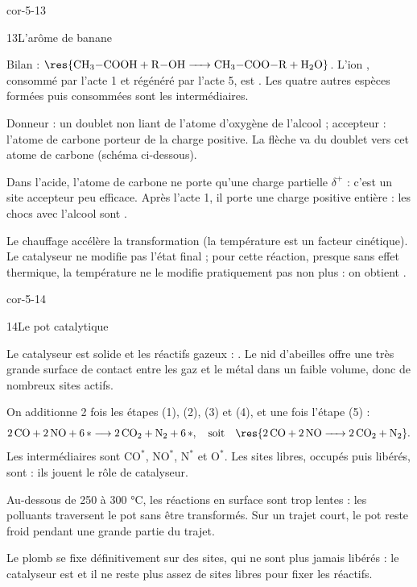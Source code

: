 \begin{blocLivre}{cor-5-13}
\begin{corrige}{13}{L'arôme de banane}
\begin{questions}
\item Bilan : $\res{\ce{CH3-COOH + R-OH -> CH3-COO-R + H2O}}$. L'ion , consommé par l'acte 1 et régénéré par
l'acte 5, est . Les quatre autres espèces formées puis consommées sont les intermédiaires.
\item Donneur : un doublet non liant de l'atome d'oxygène de l'alcool ; accepteur : l'atome de carbone porteur de la
charge positive. La flèche va du doublet vers cet atome de carbone (schéma ci-dessous).
\item Dans l'acide, l'atome de carbone ne porte qu'une charge partielle $\delta^+$ : c'est un site accepteur peu
efficace. Après l'acte 1, il porte une charge positive entière : les chocs avec l'alcool sont .
\item Le chauffage accélère la transformation (la température est un facteur cinétique). Le catalyseur ne modifie
pas l'état final ; pour cette réaction, presque sans effet thermique, la température ne le modifie pratiquement pas
non plus : on obtient .
\end{questions}
\end{corrige}
\end{blocLivre}
\begin{blocLivre}{cor-5-14}
\begin{corrige}{14}{Le pot catalytique}
\begin{questions}
\item Le catalyseur est solide et les réactifs gazeux : . Le nid d'abeilles offre une
très grande surface de contact entre les gaz et le métal dans un faible volume, donc de nombreux sites actifs.
\item On additionne 2 fois les étapes (1), (2), (3) et (4), et une fois l'étape (5) :
\[\mathrm{2\,CO+2\,NO}+6\,\ast\longrightarrow\mathrm{2\,CO_2+N_2}+6\,\ast,\quad\text{soit}\quad\res{\ce{2 CO + 2 NO -> 2 CO2 + N2}}.\]
Les intermédiaires sont $\mathrm{CO}^{\ast}$, $\mathrm{NO}^{\ast}$, $\mathrm{N}^{\ast}$ et $\mathrm{O}^{\ast}$. Les sites
libres, occupés puis libérés, sont  : ils jouent le rôle de catalyseur.
\item Au-dessous de 250 à 300 °C, les réactions en surface sont trop lentes : les polluants traversent le pot sans
être transformés. Sur un trajet court, le pot reste froid pendant une grande partie du trajet.
\item Le plomb se fixe définitivement sur des sites, qui ne sont plus jamais libérés : le catalyseur est
 et il ne reste plus assez de sites libres pour fixer les réactifs.
\end{questions}
\end{corrige}
\end{blocLivre}
